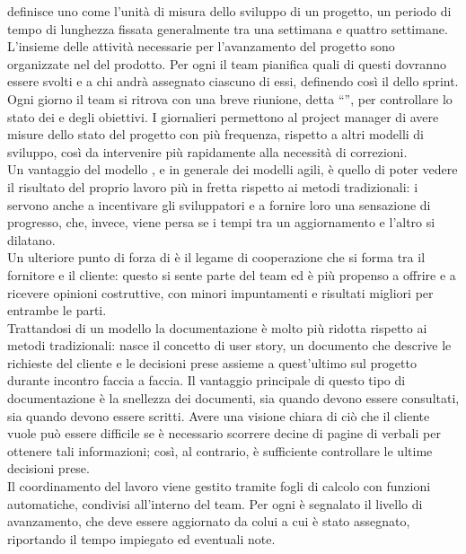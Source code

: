     definisce uno  come l'unità di misura dello sviluppo di un progetto, un periodo di tempo di lunghezza fissata generalmente tra una settimana e quattro settimane.
   L'insieme delle attività necessarie per l'avanzamento del progetto sono organizzate nel  del prodotto.
   Per ogni  il team pianifica quali di questi  dovranno essere svolti e a chi andrà assegnato ciascuno di essi, definendo così il  dello sprint.
   \\
   Ogni giorno il team si ritrova con una breve riunione, detta ``'', per controllare lo stato dei  e degli obiettivi. I  giornalieri permettono al \gls{project manager} di avere misure dello stato del progetto con più frequenza, rispetto a altri modelli di sviluppo, così da intervenire più rapidamente alla necessità di correzioni.
   \\
   Un vantaggio del modello , e in generale dei modelli agili, è quello di poter vedere il risultato del proprio lavoro più in fretta rispetto ai metodi tradizionali: i  servono anche a incentivare gli sviluppatori e a fornire loro una sensazione di progresso, che, invece, viene persa se i tempi tra un aggiornamento e l'altro si dilatano.
   \\
   Un ulteriore punto di forza di  è il legame di cooperazione che si forma tra il fornitore e il cliente: questo si sente parte del team ed è più propenso a offrire e a ricevere opinioni costruttive, con minori impuntamenti e risultati migliori per entrambe le parti.
   \\
   Trattandosi di un modello  la documentazione è molto più ridotta rispetto ai metodi tradizionali: nasce il concetto di user story, un documento che descrive le richieste del cliente e le decisioni prese assieme a quest'ultimo sul progetto durante incontro faccia a faccia. Il vantaggio principale di questo tipo di documentazione è la snellezza dei documenti, sia quando devono essere consultati, sia quando devono essere scritti. Avere una visione chiara di ciò che il cliente vuole può essere difficile se è necessario scorrere decine di pagine di verbali per ottenere tali informazioni; così, al contrario, è sufficiente controllare le ultime decisioni prese.
   \\
   Il coordinamento del lavoro viene gestito tramite fogli di calcolo con funzioni automatiche, condivisi all'interno del team. Per ogni  è segnalato il livello di avanzamento, che deve essere aggiornato da colui a cui è stato assegnato, riportando il tempo impiegato ed eventuali note.
